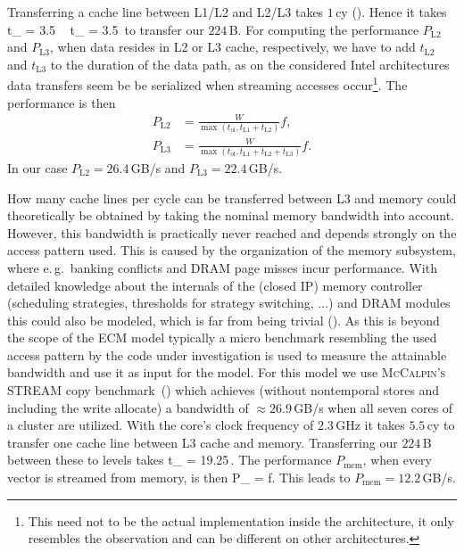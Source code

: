 Transferring a cache line between L1/L2 and L2/L3 takes $1$\,cy (\cite{intel-orm-2016}). Hence it takes
%
\be
  t_ = 3.5\,\cyw\ \ t_ = 3.5\,\cyw
\ee
%
to transfer our $224$\,B.
For computing the performance $P_\text{L2}$ and $P_\text{L3}$, when data resides
in L2 or L3 cache, respectively, we
have to add $t_\text{L2}$ and $t_\text{L3}$ to the duration of the data path, as on the considered
Intel architectures data transfers seem be be serialized when streaming accesses
occur\footnote{This need not to be the actual implementation inside the
architecture, it only resembles the observation and can be different on other
architectures.}.
The performance is then
%
\begin{align}
  P_\text{L2} &= \frac{W}{\max(t_\text{ol}, t_\text{L1} + t_\text{L2})} f, \\
  P_\text{L3} &= \frac{W}{\max(t_\text{ol}, t_\text{L1} + t_\text{L2} +
t_\text{L3})} f.
\end{align}
%
In our case $P_\text{L2} = 26.4$\,GB/s and $P_\text{L3} = 22.4$\,GB/s.
%

How many cache lines per cycle can be transferred between L3 and memory could
theoretically be obtained by taking the nominal memory bandwidth into account.
However, this bandwidth is practically never reached and depends strongly on the
access pattern used.
This is caused by the organization of the memory subsystem, where e.\,g.\ banking
conflicts and DRAM page misses incur performance.
With detailed knowledge about the internals of the (closed IP) memory controller
(scheduling strategies, thresholds for strategy switching, ...) and DRAM modules
this could also be modeled, which is far from being trivial (\cite{jacob-2007}).
As this is beyond the scope of the ECM model typically a micro benchmark
resembling the used access pattern by the code under investigation is used
to measure the attainable bandwidth and use it as input for the model.
%
For this model we use \textsc{McCalpin's} STREAM copy
benchmark~(\cite{mccalpin-1995}) which achieves (without nontemporal stores and
including the write allocate) a bandwidth of $\approx 26.9$\,GB/s when all seven cores
of a cluster are utilized.
With the core's clock frequency of $2.3$\,GHz it takes $5.5$\,cy to transfer one
cache line between L3 cache and memory.
Transferring our $224$\,B between these to levels takes
%
\be
  t_ = 19.25\,\cyw.
\ee
%
The performance $P_\text{mem}$, when every vector is streamed from memory, is then
%
\be
  P_ =  f.
\ee
%
This leads to $P_\text{mem} = 12.2$\,GB/s. 

